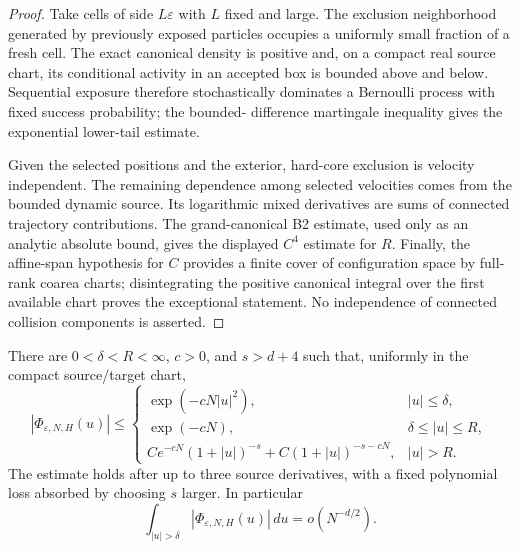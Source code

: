 \begin{proof}
Take cells of side $L\varepsilon$ with $L$ fixed and large.  The exclusion
neighborhood generated by previously exposed particles occupies a uniformly
small fraction of a fresh cell.  The exact canonical density is positive and,
on a compact real source chart, its conditional activity in an accepted box
is bounded above and below.  Sequential exposure therefore stochastically
dominates a Bernoulli process with fixed success probability; the bounded-
difference martingale inequality gives the exponential lower-tail estimate.

Given the selected positions and the exterior, hard-core exclusion is
velocity independent.  The remaining dependence among selected velocities
comes from the bounded dynamic source.  Its logarithmic mixed derivatives are
sums of connected trajectory contributions.  The grand-canonical B2 estimate,
used only as an analytic absolute bound, gives the displayed $C^4$ estimate
for $R$.  Finally, the affine-span hypothesis for $C$ provides a finite cover
of configuration space by full-rank coarea charts; disintegrating the positive
canonical integral over the first available chart proves the exceptional
statement.  No independence of connected collision components is asserted.
\end{proof}

\begin{theorem}
\label{thm:r17-b1-fourier}
There are $0<\delta<R<\infty$, $c>0$, and $s>d+4$ such that, uniformly in the
compact source/target chart,
\[
 |\Phi_{\varepsilon,N,H}(u)|\le
 \begin{cases}
 \exp(-cN|u|^2),&|u|\le\delta,\\
 \exp(-cN),&\delta\le|u|\le R,\\
 C e^{-cN}(1+|u|)^{-s}
 +C(1+|u|)^{-s-cN},&|u|>R.
 \end{cases}
\]
The estimate holds after up to three source derivatives, with a fixed
polynomial loss absorbed by choosing $s$ larger.  In particular
\[
 \int_{|u|>\delta}|\Phi_{\varepsilon,N,H}(u)|\,du=o(N^{-d/2}).
\]
\end{theorem}

